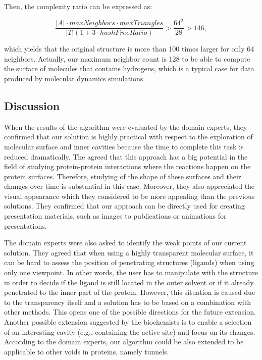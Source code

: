 Then, the complexity ratio can be expressed as:

\begin{equation}
\frac{|A| \cdot maxNeighbors \cdot maxTriangles}{|T|(1 + 3 \cdot hashFreeRatio)} > \frac{64^2}{28} > 146,
\end{equation}

which yields that the original structure is more than 100 times larger for only 64 neighbors.
Actually, our maximum neighbor count is 128 to be able to compute the surface of molecules that contains hydrogens, which is a typical case for data produced by molecular dynamics simulations.


\subsection{Discussion}
When the results of the algorithm were evaluated by the domain experts, they confirmed that our solution is highly practical with respect to the exploration of molecular surface and inner cavities because the time to complete this task is reduced dramatically.
The agreed that this approach has a big potential in the field of studying protein-protein interactions where the reactions happen on the protein surfaces.
Therefore, studying of the shape of these surfaces and their changes over time is substantial in this case.
Moreover, they also appreciated the visual appearance which they considered to be more appealing than the previous solutions.
They confirmed that our approach can be directly used for creating presentation materials, such as images to publications or animations for presentations.

The domain experts were also asked to identify the weak points of our current solution.
They agreed that when using a highly transparent molecular surface, it can be hard to assess the position of penetrating structures (ligands) when using only one viewpoint.
In other words, the user has to manipulate with the structure in order to decide if the ligand is still located in the outer solvent or if it already penetrated to the inner part of the protein.
However, this situation is caused due to the transparency itself and a solution has to be based on a combination with other methods.
This opens one of the possible directions for the future extension.
Another possible extension suggested by the biochemists is to enable a selection of an interesting cavity (e.g., containing the active site) and focus on its changes.
According to the domain experts, our algorithm could be also extended to be applicable to other voids in proteins, namely tunnels.


